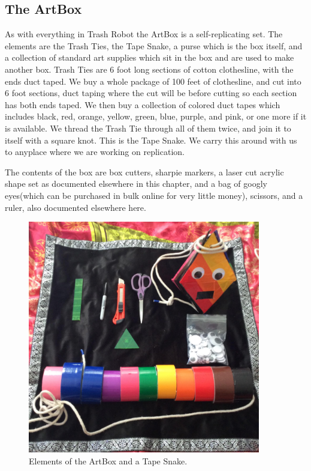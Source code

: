 \subsection{The ArtBox}

As with everything in Trash Robot the ArtBox is a self-replicating set.  The elements are the Trash Ties, the Tape Snake, a purse which is the box itself, and a collection of standard art supplies which sit in the box and are used to make another box.  Trash Ties are 6 foot long sections of cotton clothesline, with the ends duct taped.  We buy a whole package of 100 feet of clothesline, and cut into 6 foot sections, duct taping where the cut will be before cutting so each section has both ends taped.  We then buy a collection of colored duct tapes which includes black, red, orange, yellow, green, blue, purple, and pink, or one more if it is available.  We thread the Trash Tie through all of them twice, and join it to itself with a square knot.  This is the Tape Snake.  We carry this around with us to anyplace where we are working on replication. 

The contents of the box are box cutters, sharpie markers, a laser cut acrylic shape set as documented elsewhere in this chapter, and a bag of googly eyes(which can be purchased in bulk online for very little money), scissors, and a ruler, also documented elsewhere here.


\begin{figure}
	\centering
	\includegraphics[width=4in]{figures/trashrobot/artboxelements.jpg}
	\caption[artboxelements]
	{Elements of the ArtBox and a Tape Snake.}
\end{figure}


